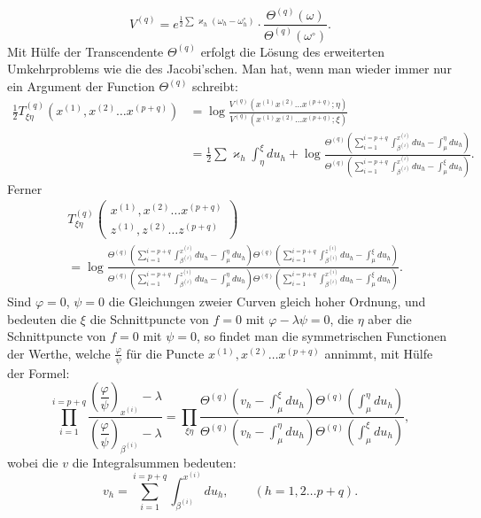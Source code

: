 \documentclass[10pt]{article}
\begin{document}
\[
V^{(q)}=e^{\frac12\sum\varkappa_h(\omega_h-\omega_h^\circ)}\cdot
\frac{\Theta^{(q)}(\omega)}{\Theta^{(q)}(\omega^\circ)}.
\]
Mit Hülfe der Transcendente \(\Theta^{(q)}\) erfolgt die Lösung des erweiterten Umkehrproblems wie die des Jacobi'schen. Man hat, wenn man wieder immer nur ein Argument der Function \(\Theta^{(q)}\) schreibt:
\[
\begin{aligned}
\frac12T_{\xi\eta}^{(q)}(x^{(1)},x^{(2)}\ldots x^{(p+q)})
&=\log\frac{V^{(q)}(x^{(1)}x^{(2)}\ldots x^{(p+q)};\eta)}{V^{(q)}(x^{(1)}x^{(2)}\ldots x^{(p+q)};\xi)}\\
&=\frac12\sum\varkappa_h\int_{\eta}^{\xi}du_h+
\log\frac{\Theta^{(q)}\left(\sum_{i=1}^{i=p+q}\int_{\beta^{(i)}}^{x^{(i)}}du_h-\int_{\mu}^{\eta}du_h\right)}{\Theta^{(q)}\left(\sum_{i=1}^{i=p+q}\int_{\beta^{(i)}}^{x^{(i)}}du_h-\int_{\mu}^{\xi}du_h\right)}.
\end{aligned}
\]
Ferner
\[
\begin{aligned}
&T_{\xi\eta}^{(q)}
\begin{pmatrix}
x^{(1)},x^{(2)}\ldots x^{(p+q)}\\
z^{(1)},z^{(2)}\ldots z^{(p+q)}
\end{pmatrix}\\
&=\log\frac{
\Theta^{(q)}\left(\sum_{i=1}^{i=p+q}\int_{\beta^{(i)}}^{x^{(i)}}du_h-\int_{\mu}^{\eta}du_h\right)
\Theta^{(q)}\left(\sum_{i=1}^{i=p+q}\int_{\beta^{(i)}}^{z^{(i)}}du_h-\int_{\mu}^{\xi}du_h\right)
}{
\Theta^{(q)}\left(\sum_{i=1}^{i=p+q}\int_{\beta^{(i)}}^{z^{(i)}}du_h-\int_{\mu}^{\eta}du_h\right)
\Theta^{(q)}\left(\sum_{i=1}^{i=p+q}\int_{\beta^{(i)}}^{x^{(i)}}du_h-\int_{\mu}^{\xi}du_h\right)
}.
\end{aligned}
\]
Sind \(\varphi=0\), \(\psi=0\) die Gleichungen zweier Curven gleich hoher Ordnung, und bedeuten die \(\xi\) die Schnittpuncte von \(f=0\) mit \(\varphi-\lambda\psi=0\), die \(\eta\) aber die Schnittpuncte von \(f=0\) mit \(\psi=0\), so findet man die symmetrischen Functionen der Werthe, welche \(\frac{\varphi}{\psi}\) für die Puncte \(x^{(1)},x^{(2)}\ldots x^{(p+q)}\) annimmt, mit Hülfe der Formel:
\[
\prod_{i=1}^{i=p+q}
\frac{\left(\dfrac{\varphi}{\psi}\right)_{x^{(i)}}-\lambda}{\left(\dfrac{\varphi}{\psi}\right)_{\beta^{(i)}}-\lambda}
=\prod_{\xi\eta}
\frac{
\Theta^{(q)}\left(v_h-\int_{\mu}^{\xi}du_h\right)
\Theta^{(q)}\left(\int_{\mu}^{\eta}du_h\right)
}{
\Theta^{(q)}\left(v_h-\int_{\mu}^{\eta}du_h\right)
\Theta^{(q)}\left(\int_{\mu}^{\xi}du_h\right)
},
\]
wobei die \(v\) die Integralsummen bedeuten:
\[
v_h=\sum_{i=1}^{i=p+q}\int_{\beta^{(i)}}^{x^{(i)}}du_h,
\qquad (h=1,2\ldots p+q).
\]
\end{document}
